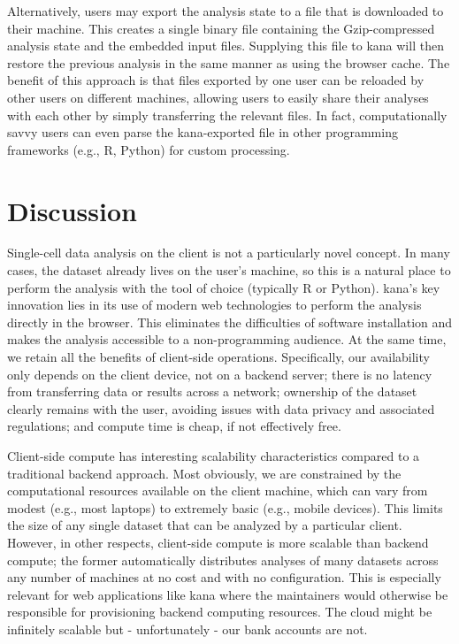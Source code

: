\documentclass{article}
\begin{document}
Alternatively, users may export the analysis state to a file that is downloaded to their machine.
This creates a single binary file containing the Gzip-compressed analysis state and the embedded input files.
Supplying this file to kana will then restore the previous analysis in the same manner as using the browser cache.
The benefit of this approach is that files exported by one user can be reloaded by other users on different machines,
allowing users to easily share their analyses with each other by simply transferring the relevant files.
In fact, computationally savvy users can even parse the kana-exported file in other programming frameworks (e.g., R, Python) for custom processing.

\section{Discussion}

Single-cell data analysis on the client is not a particularly novel concept.
In many cases, the dataset already lives on the user's machine, so this is a natural place to perform the analysis with the tool of choice (typically R or Python).
kana's key innovation lies in its use of modern web technologies to perform the analysis directly in the browser.
This eliminates the difficulties of software installation and makes the analysis accessible to a non-programming audience.
At the same time, we retain all the benefits of client-side operations.
Specifically, our availability only depends on the client device, not on a backend server;
there is no latency from transferring data or results across a network;
ownership of the dataset clearly remains with the user, avoiding issues with data privacy and associated regulations;
and compute time is cheap, if not effectively free.

Client-side compute has interesting scalability characteristics compared to a traditional backend approach.
Most obviously, we are constrained by the computational resources available on the client machine,
which can vary from modest (e.g., most laptops) to extremely basic (e.g., mobile devices).
This limits the size of any single dataset that can be analyzed by a particular client.
However, in other respects, client-side compute is more scalable than backend compute;
the former automatically distributes analyses of many datasets across any number of machines at no cost and with no configuration.
This is especially relevant for web applications like kana where the maintainers would otherwise be responsible for provisioning backend computing resources.
The cloud might be infinitely scalable but - unfortunately - our bank accounts are not.
\end{document}
